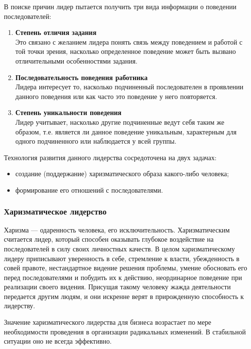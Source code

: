 \documentclass[a4paper,12pt,oneside,final]{extarticle}
\numberwithin{equation}{section}
\begin{document}
В поиске причин лидер пытается получить три вида информации о поведении последователей:
\begin{enumerate}
	\item \textbf{Степень отличия задания} \\
	Это связано с желанием лидера понять связь между поведением и работой с той точки зрения, насколько определенное поведение может быть вызвано отличительными особенностями задания. 
	\item \textbf{Последовательность поведения работника} \\ 
	Лидера интересует то, насколько подчиненный последователен в проявлении данного поведения или как часто это поведение у него повторяется.
	\item \textbf{Степень уникальности поведения} \\
	Лидер учитывает, насколько другие подчиненные ведут себя таким же образом, т.е. является ли данное поведение уникальным, характерным для одного подчиненного или наблюдается у всей группы. 
\end{enumerate}

Технология развития данного лидерства сосредоточена на двух задачах:
\begin{itemize}
	\item создание (поддержание) харизматического образа какого-либо человека;
	\item формирование его отношений с последователями. 
\end{itemize}

\subsubsection{Харизматическое лидерство}
Харизма --- одаренность человека, его исключительность. 
Харизматическим считается лидер, который способен оказывать глубокое воздействие на последователей в силу своих личностных качеств. 
В целом харизматическому лидеру приписывают уверенность в себе, стремление к власти, убежденность в совей правоте, нестандартное видение решения проблемы, умение обосновать его перед последователями и побудить их к действию, неординарное поведение при реализации своего видения. 
Присущая такому человеку жажда деятельности передается другим людям, и они искренне верят в прирожденную способность к лидерству. 

Значение харизматического лидерства для бизнеса возрастает по мере необходимости проведения в организации радикальных изменений. 
В стабильной ситуации оно не всегда эффективно. 
\end{document}
